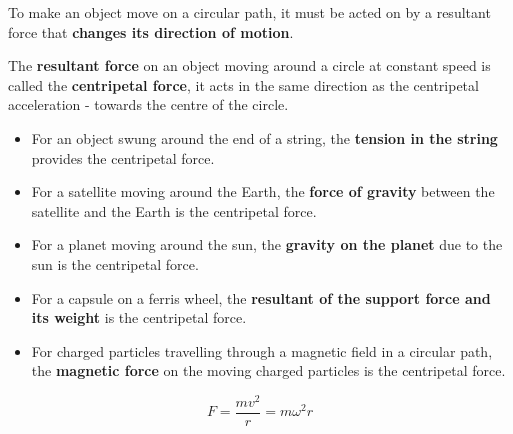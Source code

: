 To make an object move on a circular path, it must be acted on by a resultant force that \textbf{changes its direction of motion}.

The \textbf{resultant force} on an object moving around a circle at constant speed is called the \textbf{centripetal force}, it acts in the same direction as the centripetal acceleration - towards the centre of the circle.
\begin{itemize}
    \item For an object swung around the end of a string, the \textbf{tension in the string} provides the centripetal force.
    \item For a satellite moving around the Earth, the \textbf{force of gravity} between the satellite and the Earth is the centripetal force.
    \item For a planet moving around the sun, the \textbf{gravity on the planet} due to the sun is the centripetal force.
    \item For a capsule on a ferris wheel, the \textbf{resultant of the support force and its weight} is the centripetal force.
    \item For charged particles travelling through a magnetic field in a circular path, the \textbf{magnetic force} on the moving charged particles is the centripetal force.
\end{itemize}
$$F=\frac{mv^2}{r}=m\omega^2r$$

